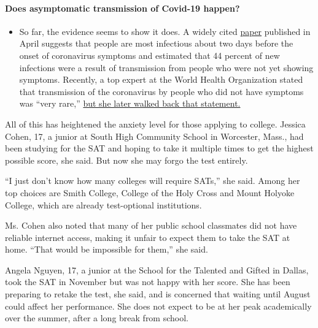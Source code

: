 \begin{itemize}
{  \paragraph{Does asymptomatic transmission of Covid-19
  happen?}\label{does-asymptomatic-transmission-of-covid-19-happen}}

  \begin{itemize}
  \tightlist
  \item
    So far, the evidence seems to show it does. A widely cited
    \href{https://www.nature.com/articles/s41591-020-0869-5}{paper}
    published in April suggests that people are most infectious about
    two days before the onset of coronavirus symptoms and estimated that
    44 percent of new infections were a result of transmission from
    people who were not yet showing symptoms. Recently, a top expert at
    the World Health Organization stated that transmission of the
    coronavirus by people who did not have symptoms was ``very rare,''
    \href{https://www.nytimes.com/2020/06/09/world/coronavirus-updates.html?action=click\&pgtype=Article\&state=default\&region=MAIN_CONTENT_3\&context=storylines_faq\#link-1f302e21}{but
    she later walked back that statement.}
  \end{itemize}
\end{itemize}

All of this has heightened the anxiety level for those applying to
college. Jessica Cohen, 17, a junior at South High Community School in
Worcester, Mass., had been studying for the SAT and hoping to take it
multiple times to get the highest possible score, she said. But now she
may forgo the test entirely.

``I just don't know how many colleges will require SATs,'' she said.
Among her top choices are Smith College, College of the Holy Cross and
Mount Holyoke College, which are already test-optional institutions.

Ms. Cohen also noted that many of her public school classmates did not
have reliable internet access, making it unfair to expect them to take
the SAT at home. ``That would be impossible for them,'' she said.

Angela Nguyen, 17, a junior at the School for the Talented and Gifted in
Dallas, took the SAT in November but was not happy with her score. She
has been preparing to retake the test, she said, and is concerned that
waiting until August could affect her performance. She does not expect
to be at her peak academically over the summer, after a long break from
school.

